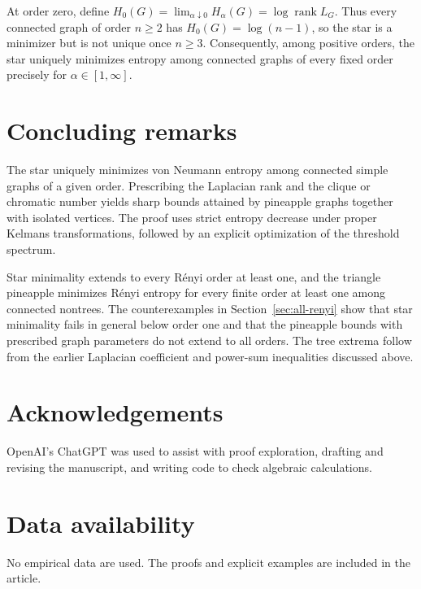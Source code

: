 \documentclass[11pt,a4paper,reqno]{amsart}
\theoremstyle{remark}
\numberwithin{equation}{section}
\begin{document}
At order zero, define
$H_0(G)=\lim_{\alpha\downarrow0}H_\alpha(G)=\log\operatorname{rank}L_G$.
Thus every connected graph of order $n\ge2$ has
$H_0(G)=\log(n-1)$, so the star is a minimizer but is not unique once
$n\ge3$. Consequently, among positive orders, the star uniquely minimizes
entropy among connected graphs of every fixed order precisely for
$\alpha\in[1,\infty]$.



\section{Concluding remarks}

The star uniquely minimizes von Neumann entropy among connected
simple graphs of a given order. Prescribing the Laplacian rank and
the clique or chromatic number yields sharp bounds attained by
pineapple graphs together with isolated vertices. The proof uses
strict entropy decrease under proper Kelmans transformations,
followed by an explicit optimization of the threshold spectrum.

Star minimality extends to every R\'enyi order at least one, and the
triangle pineapple minimizes R\'enyi entropy for every finite order
at least one among connected nontrees. The counterexamples in
Section~\ref{sec:all-renyi} show that star minimality fails in general
below order one and that the pineapple bounds with prescribed graph
parameters do not extend to all orders. The tree extrema follow from
the earlier Laplacian coefficient and power-sum inequalities discussed
above.



\section*{Acknowledgements}
OpenAI's ChatGPT was used to assist with proof exploration, drafting and
revising the manuscript, and writing code to check algebraic calculations.

\section*{Data availability}
No empirical data are used. The proofs and explicit examples are included
in the article.
\end{document}
